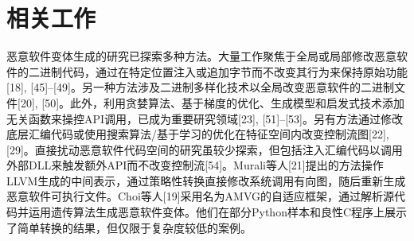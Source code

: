 \chapter{相关工作}

恶意软件变体生成的研究已探索多种方法。大量工作聚焦于全局或局部修改恶意软件的二进制代码，通过在特定位置注入或追加字节而不改变其行为来保持原始功能[18], [45]–[49]。另一种方法涉及二进制多样化技术以全局改变恶意软件的二进制文件[20], [50]。此外，利用贪婪算法、基于梯度的优化、生成模型和启发式技术添加无关函数来操控API调用，已成为重要研究领域[23], [51]–[53]。另有方法通过修改底层汇编代码或使用搜索算法/基于学习的优化在特征空间内改变控制流图[22], [29]。直接扰动恶意软件代码空间的研究虽较少探索，但包括注入汇编代码以调用外部DLL来触发额外API而不改变控制流[54]。Murali等人[21]提出的方法操作LLVM生成的中间表示，通过策略性转换直接修改系统调用有向图，随后重新生成恶意软件可执行文件。Choi等人[19]采用名为AMVG的自适应框架，通过解析源代码并运用遗传算法生成恶意软件变体。他们在部分Python样本和良性C程序上展示了简单转换的结果，但仅限于复杂度较低的案例。